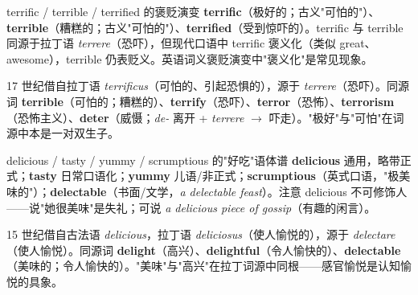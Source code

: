\documentclass[../main.tex]{subfiles}
\begin{document}



\begin{gram}{terrific / terrible / terrified 的褒贬演变}
\textbf{terrific}（极好的；古义"可怕的"）、\textbf{terrible}（糟糕的；古义"可怕的"）、\textbf{terrified}（受到惊吓的）。terrific 与 terrible 同源于拉丁语 \textit{terrere}（恐吓），但现代口语中 terrific 褒义化（类似 great、awesome），terrible 仍表贬义。英语词义褒贬演变中"褒义化"是常见现象。
\end{gram}

\begin{origin}
17 世纪借自拉丁语 \textit{terrificus}（可怕的、引起恐惧的），源于 \textit{terrere}（恐吓）。同源词 \textbf{terrible}（可怕的；糟糕的）、\textbf{terrify}（恐吓）、\textbf{terror}（恐怖）、\textbf{terrorism}（恐怖主义）、\textbf{deter}（威慑；\textit{de-} 离开 + \textit{terrere} $\to$ 吓走）。"极好"与"可怕"在词源中本是一对双生子。
\end{origin}




\begin{gram}{delicious / tasty / yummy / scrumptious 的"好吃"语体谱}
\textbf{delicious} 通用，略带正式；\textbf{tasty} 日常口语化；\textbf{yummy} 儿语/非正式；\textbf{scrumptious}（英式口语，"极美味的"）；\textbf{delectable}（书面/文学，\textit{a delectable feast}）。注意 delicious 不可修饰人——说"她很美味"是失礼；可说 \textit{a delicious piece of gossip}（有趣的闲言）。
\end{gram}

\begin{origin}
15 世纪借自古法语 \textit{delicious}，拉丁语 \textit{deliciosus}（使人愉悦的），源于 \textit{delectare}（使人愉悦）。同源词 \textbf{delight}（高兴）、\textbf{delightful}（令人愉快的）、\textbf{delectable}（美味的；令人愉快的）。"美味"与"高兴"在拉丁词源中同根——感官愉悦是认知愉悦的具象。
\end{origin}
\end{document}
